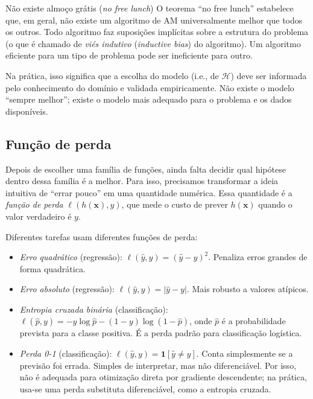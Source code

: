 \documentclass[12pt,a4paper]{article}
\begin{document}
\begin{alertabox}{Não existe almoço grátis (\textit{no free lunch})}
O teorema ``no free lunch'' estabelece que, em geral, não existe um algoritmo de AM universalmente melhor que todos os outros. Todo algoritmo faz suposições implícitas sobre a estrutura do problema (o que é chamado de \textit{viés indutivo} (\textit{inductive bias}) do algoritmo). Um algoritmo eficiente para um tipo de problema pode ser ineficiente para outro.

Na prática, isso significa que a escolha do modelo (i.e., de $\mathcal{H}$) deve ser informada pelo conhecimento do domínio e validada empiricamente. Não existe o modelo ``sempre melhor''; existe o modelo mais adequado para o problema e os dados disponíveis.
\end{alertabox}

\subsection{Função de perda}
\label{subsec:perda}

Depois de escolher uma família de funções, ainda falta decidir qual hipótese dentro dessa família é a melhor. Para isso, precisamos transformar a ideia intuitiva de ``errar pouco'' em uma quantidade numérica. Essa quantidade é a \emph{função de perda} $\ell(h(\mathbf{x}), y)$, que mede o custo de prever $h(\mathbf{x})$ quando o valor verdadeiro é $y$.

Diferentes tarefas usam diferentes funções de perda:

\begin{itemize}
    \item \emph{Erro quadrático} (regressão): $\ell(\hat{y}, y) = (\hat{y} - y)^2$. Penaliza erros grandes de forma quadrática.
    \item \emph{Erro absoluto} (regressão): $\ell(\hat{y}, y) = |\hat{y} - y|$. Mais robusto a valores atípicos.
    \item \emph{Entropia cruzada binária} (classificação): $\ell(\hat{p}, y) = -y\log\hat{p} - (1-y)\log(1-\hat{p})$, onde $\hat{p}$ é a probabilidade prevista para a classe positiva. É a perda padrão para classificação logística.
    \item \emph{Perda 0-1} (classificação): $\ell(\hat{y}, y) = \mathbf{1}[\hat{y} \ne y]$. Conta simplesmente se a previsão foi errada. Simples de interpretar, mas não diferenciável. Por isso, não é adequada para otimização direta por gradiente descendente; na prática, usa-se uma perda substituta diferenciável, como a entropia cruzada.
\end{itemize}
\end{document}
